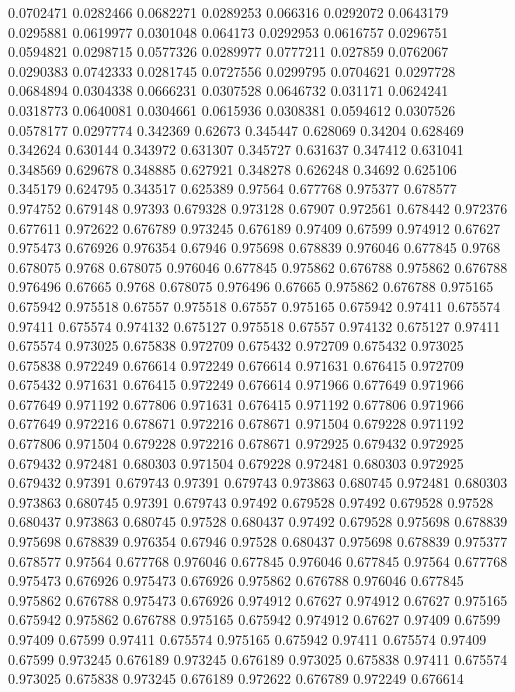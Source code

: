 0.0702471 0.0282466
0.0682271 0.0289253
0.066316 0.0292072
0.0643179 0.0295881
0.0619977 0.0301048
0.064173 0.0292953
0.0616757 0.0296751
0.0594821 0.0298715
0.0577326 0.0289977
0.0777211 0.027859
0.0762067 0.0290383
0.0742333 0.0281745
0.0727556 0.0299795
0.0704621 0.0297728
0.0684894 0.0304338
0.0666231 0.0307528
0.0646732 0.031171
0.0624241 0.0318773
0.0640081 0.0304661
0.0615936 0.0308381
0.0594612 0.0307526
0.0578177 0.0297774
0.342369 0.62673
0.345447 0.628069
0.34204 0.628469
0.342624 0.630144
0.343972 0.631307
0.345727 0.631637
0.347412 0.631041
0.348569 0.629678
0.348885 0.627921
0.348278 0.626248
0.34692 0.625106
0.345179 0.624795
0.343517 0.625389
0.97564 0.677768
0.975377 0.678577
0.974752 0.679148
0.97393 0.679328
0.973128 0.67907
0.972561 0.678442
0.972376 0.677611
0.972622 0.676789
0.973245 0.676189
0.97409 0.67599
0.974912 0.67627
0.975473 0.676926
0.976354 0.67946
0.975698 0.678839
0.976046 0.677845
0.9768 0.678075
0.9768 0.678075
0.976046 0.677845
0.975862 0.676788
0.975862 0.676788
0.976496 0.67665
0.9768 0.678075
0.976496 0.67665
0.975862 0.676788
0.975165 0.675942
0.975518 0.67557
0.975518 0.67557
0.975165 0.675942
0.97411 0.675574
0.97411 0.675574
0.974132 0.675127
0.975518 0.67557
0.974132 0.675127
0.97411 0.675574
0.973025 0.675838
0.972709 0.675432
0.972709 0.675432
0.973025 0.675838
0.972249 0.676614
0.972249 0.676614
0.971631 0.676415
0.972709 0.675432
0.971631 0.676415
0.972249 0.676614
0.971966 0.677649
0.971966 0.677649
0.971192 0.677806
0.971631 0.676415
0.971192 0.677806
0.971966 0.677649
0.972216 0.678671
0.972216 0.678671
0.971504 0.679228
0.971192 0.677806
0.971504 0.679228
0.972216 0.678671
0.972925 0.679432
0.972925 0.679432
0.972481 0.680303
0.971504 0.679228
0.972481 0.680303
0.972925 0.679432
0.97391 0.679743
0.97391 0.679743
0.973863 0.680745
0.972481 0.680303
0.973863 0.680745
0.97391 0.679743
0.97492 0.679528
0.97492 0.679528
0.97528 0.680437
0.973863 0.680745
0.97528 0.680437
0.97492 0.679528
0.975698 0.678839
0.975698 0.678839
0.976354 0.67946
0.97528 0.680437
0.975698 0.678839
0.975377 0.678577
0.97564 0.677768
0.976046 0.677845
0.976046 0.677845
0.97564 0.677768
0.975473 0.676926
0.975473 0.676926
0.975862 0.676788
0.976046 0.677845
0.975862 0.676788
0.975473 0.676926
0.974912 0.67627
0.974912 0.67627
0.975165 0.675942
0.975862 0.676788
0.975165 0.675942
0.974912 0.67627
0.97409 0.67599
0.97409 0.67599
0.97411 0.675574
0.975165 0.675942
0.97411 0.675574
0.97409 0.67599
0.973245 0.676189
0.973245 0.676189
0.973025 0.675838
0.97411 0.675574
0.973025 0.675838
0.973245 0.676189
0.972622 0.676789
0.972249 0.676614
